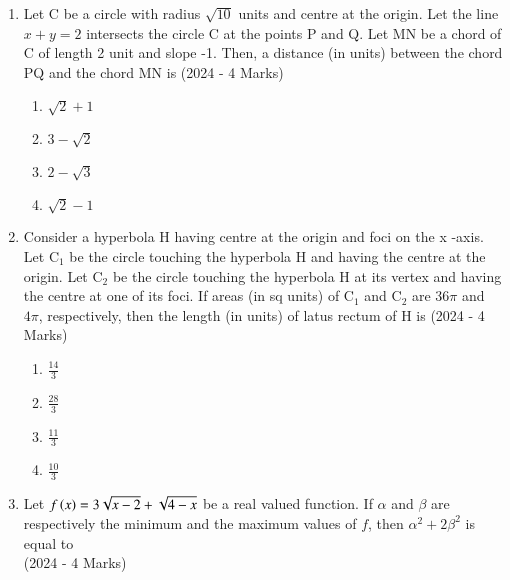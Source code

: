 \documentclass[journal]{IEEEtran}
\begin{document}
\begin{enumerate}
{        }
    \item{
     		
     		Let C be a circle with radius $\sqrt{10}$ units and centre at the origin. Let the 
     		line $x+y=2$ intersects the circle C at the points P and Q. Let MN be a chord of C 
     		of length 2 unit and slope -1. Then, a distance (in units) between the chord PQ and the chord MN is \text{ }
            \hfill
            {(2024 - 4 Marks)}
            \begin{multicols}{4}
                \begin{enumerate}
                	\item $\sqrt{2}+1$
                	\item $3-\sqrt{2}$
                	\item $2-\sqrt{3}$
                	\item $\sqrt{2}-1$
                \end{enumerate}
            \end{multicols}
        
        }
    \item{
            
            Consider a hyperbola H having centre at the origin and foci on the x -axis. Let $\mathrm{C}_{1}$ be the circle touching the hyperbola H and having the centre at the origin. Let $\mathrm{C}_{2}$ be the circle touching the hyperbola H at its vertex and having the centre at one of its foci. If areas (in sq units) of $\mathrm{C}_{1}$ and $\mathrm{C}_{2}$ are $36 \pi$ and $4 \pi$, respectively, then the length (in units) of latus rectum of H is \text{ }
           	\hfill
                {(2024 - 4 Marks)}
            
           \begin{multicols}{4}
            	\begin{enumerate}
            		\item $\frac{14}{3}$
            		\item $\frac{28}{3}$
            		\item $\frac{11}{3}$
            		\item $\frac{10}{3}$
            	\end{enumerate}
            \end{multicols}
        
        }
        \item{
        	
        	Let $f\left(x\right)=3 \sqrt{x-2}+\sqrt{4-x}$ be a real valued function. If $\alpha$ and $\beta$ are respectively the minimum and the maximum values of $f$, then $\alpha^{2}+2 \beta^{2}$ is equal to\\
        	\text{ }
        	\hfill
        	{(2024 - 4 Marks)}
        	
}
\end{enumerate}
\end{document}
